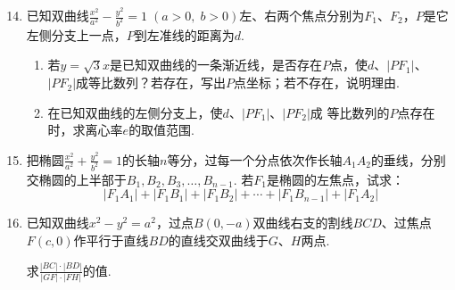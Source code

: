 \begin{enumerate}\setcounter{enumi}{13}
    \item 已知双曲线$\frac{x^2}{a^2}-\frac{y^2}{b^2}=1\; (a>0,\; b>0)$左、右两个焦点分别为$F_1$、$F_2$，$P$是它左侧分支上一点，$P$到左准线的距离为$d$.
\begin{enumerate}[(1)]
 \item 若$y=\sqrt{3}x$是已知双曲线的一条渐近线，是否存在$P$点，使$d$、$|PF_1|$、$|PF_2|$成等比数列？若存在，写出$P$点坐标；若不存在，说明理由.
\item 在已知双曲线的左侧分支上，使$d$、$|PF_1|$、$|PF_2|$成
    等比数列的$P$点存在时，求离心率$e$的取值范围.  
\end{enumerate}

    \item 把椭圆$\frac{x^2}{a^2}+\frac{y^2}{b^2}=1$的长轴$n$等分，过每一个分点依次作长轴$A_1A_2$的垂线，分别交椭圆的上半部于$B_1,B_2,B_3,\ldots,B_{n-1}$. 若$F_1$是椭圆的左焦点，试求：
    \[|F_1A_1|+|F_1B_1|+|F_1B_2|+\cdots+|F_1B_{n-1}|+|F_1A_2|\]

\item 已知双曲线$x^2-y^2=a^2$，过点$B(0,-a)$双曲线右支的割线$BCD$、过焦点$F(c,0)$作平行于直线$BD$的直线交双曲线于$G$、$H$两点. 

求$\frac{|BC|\cdot |BD|}{|GF|\cdot |FH|}$的值.
\end{enumerate}